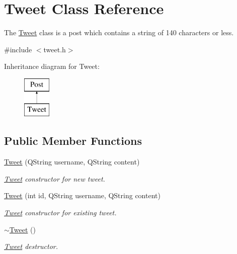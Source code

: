 \hypertarget{classTweet}{}\section{Tweet Class Reference}
\label{classTweet}


The \hyperlink{classTweet}{Tweet} class is a post which contains a string of 140 characters or less.  




{\ttfamily \#include $<$tweet.\+h$>$}

Inheritance diagram for Tweet\+:\begin{figure}[H]
\begin{center}
\leavevmode
\includegraphics[height=2.000000cm]{classTweet}
\end{center}
\end{figure}
\subsection*{Public Member Functions}
\begin{DoxyCompactItemize}
\item 
\hyperlink{classTweet_a5a974adac1df635731ad7f00685f283e}{Tweet} (Q\+String username, Q\+String content)
\begin{DoxyCompactList}\small\item\em \hyperlink{classTweet}{Tweet} constructor for new tweet. \end{DoxyCompactList}\item 
\hyperlink{classTweet_a0deebf0438e7f8d13cb566d9362e9da3}{Tweet} (int id, Q\+String username, Q\+String content)
\begin{DoxyCompactList}\small\item\em \hyperlink{classTweet}{Tweet} constructor for existing tweet. \end{DoxyCompactList}\item 
\hyperlink{classTweet_a81d6643e4ee5616281339d2918ca415b}{$\sim$\+Tweet} ()\hypertarget{classTweet_a81d6643e4ee5616281339d2918ca415b}{}\label{classTweet_a81d6643e4ee5616281339d2918ca415b}

\begin{DoxyCompactList}\small\item\em \hyperlink{classTweet}{Tweet} destructor. \end{DoxyCompactList}\end{DoxyCompactItemize}
